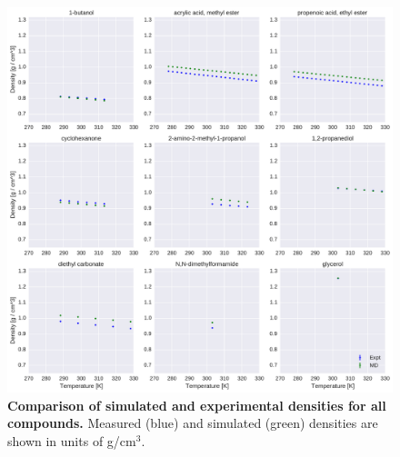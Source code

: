 \documentclass[journal=jacsat,manuscript=article]{achemso}
\begin{document}
\begin{figure}[alldensity]

\includegraphics[width=\textwidth]{./figures/densities_versus_temperature_part0.pdf}

\caption{{\bf Comparison of simulated and experimental densities for all compounds.} 
Measured (blue) and simulated (green) densities are shown in units of g/cm$^{3}$.
\label{figure:AllDensities}
}

\end{figure}
\end{document}

